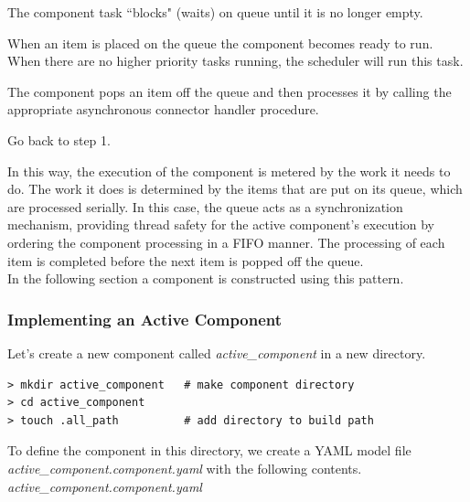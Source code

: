 \vspace{5mm} %
\begin{spacedenumerate}
  \item The component task ``blocks" (waits) on queue until it is no longer empty.
  \item When an item is placed on the queue the component becomes ready to run. When there are no higher priority tasks running, the scheduler will run this task.
  \item The component pops an item off the queue and then processes it by calling the appropriate asynchronous connector handler procedure.
  \item Go back to step 1.
\end{spacedenumerate}
\vspace{5mm} %

In this way, the execution of the component is metered by the work it needs to do. The work it does is determined by the items that are put on its queue, which are processed serially. In this case, the queue acts as a synchronization mechanism, providing thread safety for the active component's execution by ordering the component processing in a FIFO manner. The processing of each item is completed before the next item is popped off the queue. \\

In the following section a component is constructed using this pattern.

\subsubsection{Implementing an Active Component}

Let's create a new component called \textit{active\_component} in a new directory.

\vspace{5mm} %
\begin{verbatim}
> mkdir active_component   # make component directory
> cd active_component 
> touch .all_path          # add directory to build path
\end{verbatim}
\vspace{5mm} %

To define the component in this directory, we create a YAML model file \textit{active\_component.component.yaml} with the following contents. \\

\textit{active\_component.component.yaml}

